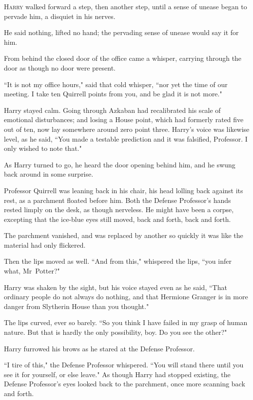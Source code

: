 
\lettrine{H}{arry} walked forward a step, then another step, until a sense of unease began to pervade him, a disquiet in his nerves.

He said nothing, lifted no hand; the pervading sense of unease would say it for him.

From behind the closed door of the office came a whisper, carrying through the door as though no door were present.

``It is not my office hours," said that cold whisper, ``nor yet the time of our meeting. I take ten Quirrell points from you, and be glad it is not more."

Harry stayed calm. Going through Azkaban had recalibrated his scale of emotional disturbances; and losing a House point, which had formerly rated five out of ten, now lay somewhere around zero point three. Harry's voice was likewise level, as he said, ``You made a testable prediction and it was falsified, Professor. I only wished to note that."

As Harry turned to go, he heard the door opening behind him, and he swung back around in some surprise.

Professor Quirrell was leaning back in his chair, his head lolling back against its rest, as a parchment floated before him. Both the Defense Professor's hands rested limply on the desk, as though nerveless. He might have been a corpse, excepting that the ice-blue eyes still moved, back and forth, back and forth.

The parchment vanished, and was replaced by another so quickly it was like the material had only flickered.

Then the lips moved as well. ``And from this," whispered the lips, ``you infer what, Mr~Potter?"

Harry was shaken by the sight, but his voice stayed even as he said, ``That ordinary people do not always do nothing, and that Hermione Granger is in more danger from Slytherin House than you thought."

The lips curved, ever so barely. ``So you think I have failed in my grasp of human nature. But that is hardly the only possibility, boy. Do you see the other?"

Harry furrowed his brows as he stared at the Defense Professor.

``I tire of this," the Defense Professor whispered. ``You will stand there until you see it for yourself, or else leave." As though Harry had stopped existing, the Defense Professor's eyes looked back to the parchment, once more scanning back and forth.

